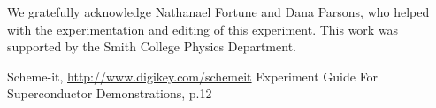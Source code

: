 \documentclass[prb,preprint]{revtex4-1}
\begin{document}
\begin{acknowledgments}

We gratefully acknowledge Nathanael Fortune and Dana Parsons, who helped with the experimentation and editing of this experiment. This work was supported by the Smith College Physics Department.

\end{acknowledgments}


\begin{thebibliography}{99}

 Scheme-it, \url{http://www.digikey.com/schemeit}
 Experiment Guide For Superconductor Demonstrations, p.12

\end{thebibliography}

\end{document}
